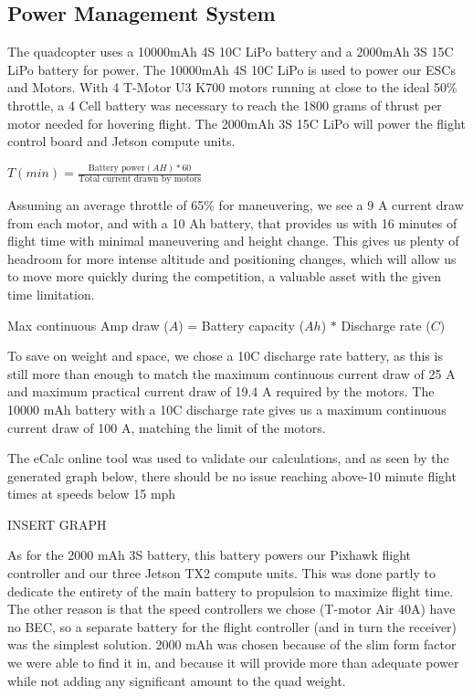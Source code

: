 \documentclass[12pt,letterpaper]{article}
\begin{document}
	\subsection*{Power Management System}
		The quadcopter uses a 10000mAh 4S 10C LiPo battery and a 2000mAh 3S 15C LiPo battery for power. The 10000mAh 4S 10C LiPo is used to power our ESCs and Motors. With 4 T-Motor U3 K700 motors running at close to the ideal 50\% throttle, a 4 Cell battery was necessary to reach the 1800 grams of thrust per motor needed for hovering flight. The 2000mAh 3S 15C LiPo will power the flight control board and Jetson compute units.
		\begin{center}
			$T(min) = \frac{\text{Battery power}(AH) * 60}{\text{Total current drawn by motors}}$
		\end{center}

		Assuming an average throttle of 65\% for maneuvering, we see a 9 A current draw from each motor, and with a 10 Ah battery, that provides us with 16 minutes of flight time with minimal maneuvering and height change. This gives us plenty of headroom for more intense altitude and positioning changes, which will allow us to move more quickly during the competition, a valuable asset with the given time limitation.
		\begin{center}
			Max continuous Amp draw ($A$) = Battery capacity ($Ah$) $*$ Discharge rate ($C$)
		\end{center}

		To save on weight and space, we chose a 10C discharge rate battery, as this is still more than enough to match the maximum continuous current draw of 25 A and maximum practical current draw of 19.4 A required by the motors. The 10000 mAh battery with a 10C discharge rate gives us a maximum continuous current draw of 100 A, matching the limit of the motors.

		The eCalc online tool was used to validate our calculations, and as seen by the generated graph below, there should be no issue reaching above-10 minute flight times at speeds below 15 mph

		INSERT GRAPH

		As for the 2000 mAh 3S battery, this battery powers our Pixhawk flight controller and our three Jetson TX2 compute units. This was done partly to dedicate the entirety of the main battery to propulsion to maximize flight time. The other reason is that the speed controllers we chose (T-motor Air 40A) have no BEC, so a separate battery for the flight controller (and in turn the receiver) was the simplest solution. 2000 mAh was chosen because of the slim form factor we were able to find it in, and because it will provide more than adequate power while not adding any significant amount to the quad weight.
\end{document}
